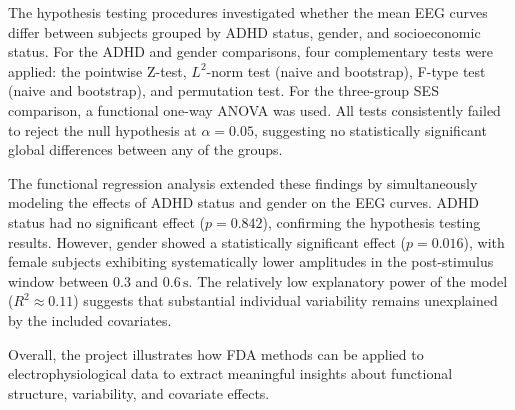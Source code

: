 \documentclass[twoside,11pt]{article}
\begin{document}
The hypothesis testing procedures investigated whether the mean EEG curves differ between subjects
grouped by ADHD status, gender, and socioeconomic status. For the ADHD and gender comparisons, four
complementary tests were applied: the pointwise Z-test, $L^2$-norm test (naive and bootstrap),
F-type test (naive and bootstrap), and permutation test. For the three-group SES comparison, a
functional one-way ANOVA was used. All tests consistently failed to reject the null hypothesis at
$\alpha = 0.05$, suggesting no statistically significant global differences between any of the
groups.

The functional regression analysis extended these findings by simultaneously modeling the effects of
ADHD status and gender on the EEG curves. ADHD status had no significant effect ($p = 0.842$),
confirming the hypothesis testing results. However, gender showed a statistically significant effect
($p = 0.016$), with female subjects exhibiting systematically lower amplitudes in the post-stimulus
window between $0.3$ and $0.6\,\mathrm{s}$. The relatively low explanatory power of the model ($R^2
\approx 0.11$) suggests that substantial individual variability remains unexplained by the included
covariates.

Overall, the project illustrates how FDA methods can be applied to electrophysiological data to
extract meaningful insights about functional structure, variability, and covariate effects.


\end{document}
